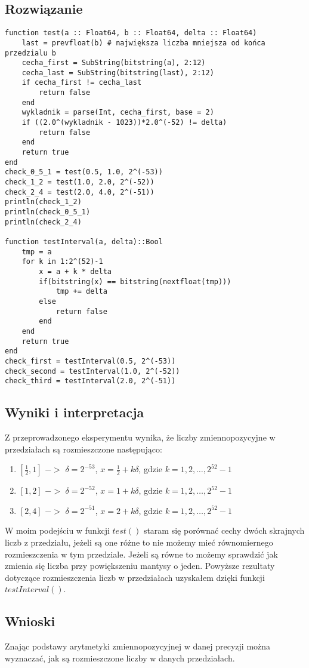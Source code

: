 \documentclass[11pt]{article}
\begin{document}
\subsection{Rozwiązanie}
\begin{verbatim}
function test(a :: Float64, b :: Float64, delta :: Float64)
    last = prevfloat(b) # największa liczba mniejsza od końca przedzialu b
    cecha_first = SubString(bitstring(a), 2:12)
    cecha_last = SubString(bitstring(last), 2:12)
    if cecha_first != cecha_last
        return false
    end
    wykladnik = parse(Int, cecha_first, base = 2)
    if ((2.0^(wykladnik - 1023))*2.0^(-52) != delta)
        return false
    end
    return true
end
check_0_5_1 = test(0.5, 1.0, 2^(-53))
check_1_2 = test(1.0, 2.0, 2^(-52))
check_2_4 = test(2.0, 4.0, 2^(-51))
println(check_1_2)
println(check_0_5_1)
println(check_2_4)

function testInterval(a, delta)::Bool
    tmp = a
    for k in 1:2^(52)-1
        x = a + k * delta
        if(bitstring(x) == bitstring(nextfloat(tmp)))
            tmp += delta
        else 
            return false
        end
    end
    return true
end
check_first = testInterval(0.5, 2^(-53))
check_second = testInterval(1.0, 2^(-52))
check_third = testInterval(2.0, 2^(-51))
\end{verbatim}
\subsection{Wyniki i interpretacja}
Z przeprowadzonego eksperymentu wynika, że liczby zmiennopozycyjne w przedziałach są rozmieszczone następująco:
\begin{enumerate}
    \item $\left[\frac{1}{2},1\right]$ $->$ $\delta=2^{-53}$, $x=\frac{1}{2}+k\delta$, gdzie $k=1,2,\dots,2^{52}-1$
    \item $\left[1,2\right]$ $->$ $\delta=2^{-52}$, $x=1+k\delta$, gdzie $k=1,2,\dots,2^{52}-1$
    \item $\left[2,4\right]$ $->$ $\delta=2^{-51}$, $x=2+k\delta$, gdzie $k=1,2,\dots,2^{52}-1$
\end{enumerate}
W moim podejściu w funkcji $test()$ staram się porównać cechy dwóch skrajnych liczb z przedziału, jeżeli są one różne to nie możemy mieć równomiernego rozmieszczenia w tym przedziale. Jeżeli są równe to możemy sprawdzić jak zmienia się liczba przy powiększeniu mantysy o jeden. Powyższe rezultaty dotyczące rozmieszczenia liczb w przedziałach uzyskałem dzięki funkcji $testInterval()$.
\subsection{Wnioski}
Znając podstawy arytmetyki zmiennopozycyjnej w danej precyzji można wyznaczać, jak są rozmieszczone liczby w danych przedziałach.
\end{document}
